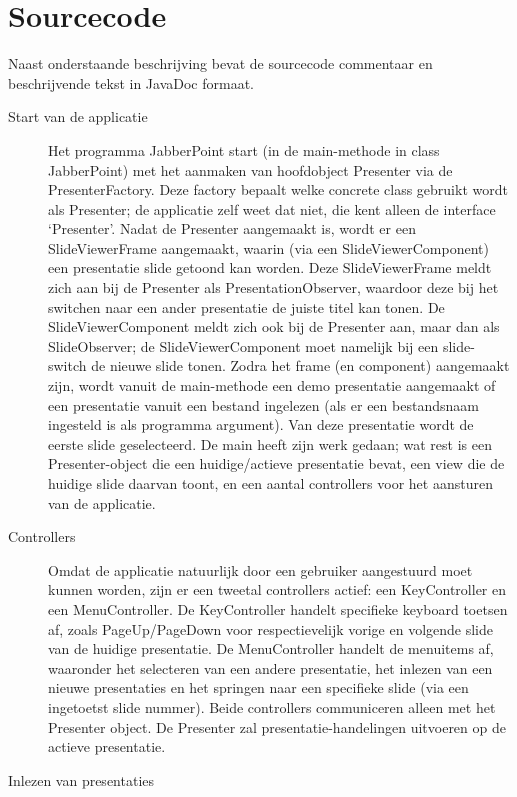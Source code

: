 \documentclass[a4paper]{article}
\begin{document}
\section{Sourcecode}
Naast onderstaande beschrijving bevat de sourcecode commentaar en beschrijvende tekst in JavaDoc formaat.

\begin{description}
\item[Start van de applicatie] Het programma JabberPoint start (in de main-methode in class JabberPoint) met het aanmaken van hoofdobject Presenter via de PresenterFactory. Deze factory bepaalt welke concrete class gebruikt wordt als Presenter; de applicatie zelf weet dat niet, die kent alleen de interface ‘Presenter’.
Nadat de Presenter aangemaakt is, wordt er een SlideViewerFrame aangemaakt, waarin (via een SlideViewerComponent) een presentatie slide getoond kan worden. Deze SlideViewerFrame meldt zich aan bij de Presenter als PresentationObserver, waardoor deze bij het switchen naar een ander presentatie de juiste titel kan tonen. De SlideViewerComponent meldt zich ook bij de Presenter aan, maar dan als SlideObserver; de SlideViewerComponent moet namelijk bij een slide-switch de nieuwe slide tonen.
Zodra het frame (en component) aangemaakt zijn, wordt vanuit de main-methode een demo presentatie aangemaakt of een presentatie vanuit een bestand ingelezen (als er een bestandsnaam ingesteld is als programma argument). Van deze presentatie wordt de eerste slide geselecteerd.
De main heeft zijn werk gedaan; wat rest is een Presenter-object die een huidige/actieve presentatie bevat, een view die de huidige slide daarvan toont, en een aantal controllers voor het aansturen van de applicatie.
\item[Controllers]
Omdat de applicatie natuurlijk door een gebruiker aangestuurd moet kunnen worden, zijn er een tweetal controllers actief: een KeyController en een MenuController. De KeyController handelt specifieke keyboard toetsen af, zoals PageUp/PageDown voor respectievelijk vorige en volgende slide van de huidige presentatie. De MenuController handelt de menuitems af, waaronder het selecteren van een andere presentatie, het inlezen van een nieuwe presentaties en het springen naar een specifieke slide (via een ingetoetst slide nummer). Beide controllers communiceren alleen met het Presenter object. De Presenter zal presentatie-handelingen uitvoeren op de actieve presentatie.
\item[Inlezen van presentaties]

\end{description}
\end{document}
